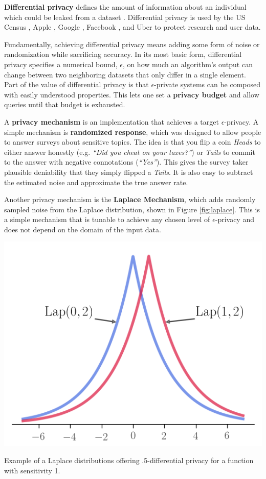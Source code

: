 \documentclass[nobib]{tufte-handout}
\begin{document}
\textbf{Differential privacy} defines the amount of information about an
individual which could be leaked from a dataset \cite{dwork2014algorithmic}.
Differential privacy is used by the US Census \cite{census-differential-privacy},
Apple \cite{apple-differential-privacy}, Google \cite{google-differential-privacy},
Facebook \cite{facebook-url-release}, and Uber \cite{uber-differential-privacy}
to protect research and user data.

Fundamentally, achieving differential privacy means adding some form of noise or
randomization while sacrificing accuracy. In its most basic form, differential
privacy specifies a numerical bound, $\epsilon$, on how much an
algorithm’s output can change between two neighboring datasets that only differ
in a single element. Part of the value of differential privacy is that
$\epsilon$-private systems can be composed with easily understood properties.
This lets one set a \textbf{privacy budget} and allow queries until that
budget is exhausted.

A \textbf{privacy mechanism} is an implementation that achieves a target
$\epsilon$-privacy. A simple mechanism is \textbf{randomized response}, which
was designed to allow people to answer surveys about sensitive topics. The idea
is that you flip a coin \textit{Heads} to either answer honestly 
(e.g. \textit{“Did you cheat on your taxes?”}) or \textit{Tails} to commit to
the answer with negative connotations (\textit{“Yes”}). This gives the survey
taker plausible deniability that they simply flipped a \textit{Tails}. It is
also easy to subtract the estimated noise and approximate the true answer rate.

Another privacy mechanism is the \textbf{Laplace Mechanism}, which adds randomly
sampled noise from the Laplace distribution, shown in Figure \ref{fig:laplace}.
This is a simple mechanism that is tunable to achieve any chosen level of
$\epsilon$-privacy and does not depend on the domain of the input data.

\begin{marginfigure} \includegraphics[width=\linewidth]{laplace}
\caption{Example of a Laplace distributions offering .5-differential privacy for
a function with sensitivity 1.} \label{fig:laplace} \end{marginfigure}
\end{document}
